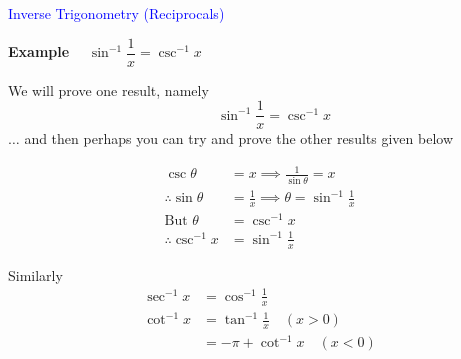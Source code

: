 \documentclass[14pt,fleqn]{extarticle}
\begin{document}
\begin{skill}
\textcolor{blue}{Inverse Trigonometry (Reciprocals)}

\small{\textbf{Example} }$\quad \sin^{-1}\dfrac{1}{x} = \csc^{-1} x$
\end{skill}

\newcard 

We will prove one result, namely
\[ \qquad \sin^{-1}\frac{1}{x} = \csc^{-1} x\]
$\ldots$ and then perhaps you can try and prove the other results given below

%
\begin{align}
\csc\theta &= x \implies \frac{1}{\sin\theta} =x \\
\therefore \sin\theta &= \frac{1}{x} 
\implies \theta = \sin^{-1}\frac{1}{x} \\
\text{But }\theta &= \csc^{-1} x \\
\therefore \csc^{-1}x &= \sin^{-1}\frac{1}{x} 
\end{align}

Similarly 
%
\begin{align}
\sec^{-1} x &= \cos^{-1}\frac{1}{x} \\ 
\cot^{-1} x &= \tan^{-1}\frac{1}{x} \quad (x >  0) \\
&= -\pi + \cot^{-1} x \quad (x < 0) 
\end{align}
\end{document}
